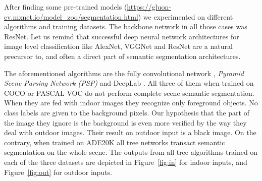 \documentclass[12pt,a4paper,table,dvipsnames,tikz]{report}
\newcommand{\term}{\textit}
\newcommand{\acronym}{\MakeUppercase}
\newcommand{\bl}[1]{{\hypersetup{linkcolor=blue}#1}}
\begin{document}
	After finding some pre-trained models (\url{https://gluon-cv.mxnet.io/model_zoo/segmentation.html}) 
	we experimented on different algorithms and training datasets. The backbone network in 
	all those cases was ResNet. Let us remind that successful deep neural network architectures 
	for image level classification like AlexNet, VGGNet and ResNet are a natural precursor 
	to, and often a direct part of semantic segmentation architectures. 
	\par
	The aforementioned algorithms are the fully convolutional network \citep{Long}, 
	\term{Pyramid Scene Parsing Network (\acronym{psp})} \citep{Zhao} and DeepLab \citep{Chen}. 
	All three of them when trained on \acronym{coco} or \acronym{pascal voc} do not perform 
	complete scene semantic segmentation. When they are fed with indoor images they recognize 
	only foreground objects. No class labels are given to the background pixels. Our 
	hypothesis that the part of the image they ignore is the background is even more 
	verified by the way they deal with outdoor images. Their result on outdoor input is 
	a black image. On the contrary, when trained on \acronym{ade20k} all tree networks 
	transact semantic segmentation on the whole scene. The outputs from all tree algorithms 
	trained on each of the three datasets are depicted in Figure~\bl{\ref{fig:in}} for indoor 
	inputs, and Figure~\bl{\ref{fig:out}} for outdoor inputs.
	\\
	
\end{document}
